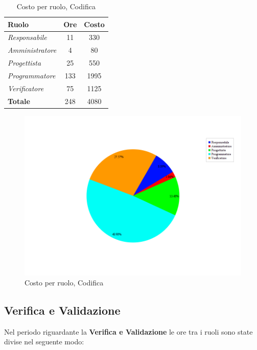 \begin{table}[H]
	\begin{center}
		\begin{tabular}{|l|c|c|}
			\hline
			\textbf{Ruolo}	& \textbf{Ore} &	\textbf{Costo}	 \\
			\hline
			\textit{Responsabile}	&	11	&	330		\\
			\hline
			\textit{Amministratore}	&	4	&	80		\\
			\hline
			\textit{Progettista}		&	25	&	550		\\
			\hline
			\textit{Programmatore}	&	133	&	1995	\\
			\hline
			\textit{Verificatore}	&	75	&	1125	\\
			\hline
			\textbf{Totale}	&	248	&	4080	\\
			\hline
		\end{tabular}
	\end{center}
	\caption{Costo per ruolo, Codifica}
\end{table}

\begin{figure}[H]
	\centering
	\includegraphics[scale=0.4]{immagini/Grafi/CostoCod}
	\caption{Costo per ruolo, Codifica}
\end{figure}

\subsection{Verifica e Validazione}
Nel periodo riguardante la \textbf{Verifica e Validazione} le ore tra i ruoli sono state divise nel seguente modo:

